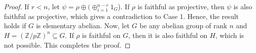 \documentclass[10pt,a4paper]{amsart}
\newcommand{\Z}{\mathbb{Z}}
\begin{document}
\begin{proof}
	If $r<n$, let $\psi= \rho \oplus (\oplus_{i=1}^{n-r} 1_G$). If $\rho$ is faithful as projective, then $\psi$ is also faithful as projective, which gives a contradiction to Case 1. Hence, the result holds if $G$ is elementary abelian. 
	Now, let $G$ be any abelian group of rank $n$ and $H= (\Z/p\Z)^n \subseteq G$. If $\rho$ is faithful on $G$, then it is also faithful on $H$, which is not possible. This completes the proof.
	
\end{proof}
\end{document}
